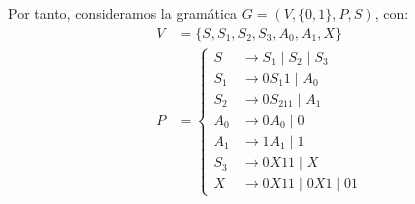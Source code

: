 \begin{ejercicio}
    Por tanto, consideramos la gramática $G=(V,\{0,1\},P,S)$, con:
    \begin{align*}
        V&= \{ S, S_1, S_2, S_3, A_0, A_1, X \}\\
        P&= \left\{
            \begin{aligned}
                S &\to S_1 \mid S_2 \mid S_3\\
                S_1 &\to 0S_1 1 \mid A_0\\
                S_2 &\to 0S_211 \mid A_1\\
                A_0 &\to 0A_0 \mid 0\\
                A_1 &\to 1A_1 \mid 1\\
                S_3 &\to 0X11 \mid X\\
                X & \to 0X11 \mid 0X1 \mid 01
            \end{aligned}
        \right.
    \end{align*}
\end{ejercicio}

